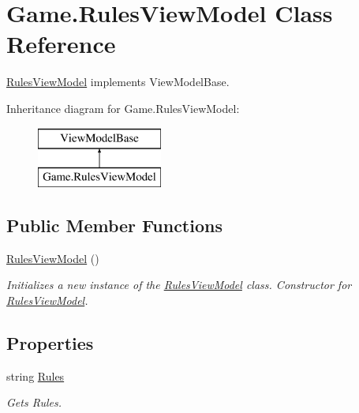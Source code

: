 \hypertarget{class_game_1_1_rules_view_model}{}\section{Game.\+Rules\+View\+Model Class Reference}
\label{class_game_1_1_rules_view_model}


\mbox{\hyperlink{class_game_1_1_rules_view_model}{Rules\+View\+Model}} implements View\+Model\+Base.  


Inheritance diagram for Game.\+Rules\+View\+Model\+:\begin{figure}[H]
\begin{center}
\leavevmode
\includegraphics[height=2.000000cm]{class_game_1_1_rules_view_model}
\end{center}
\end{figure}
\subsection*{Public Member Functions}
\begin{DoxyCompactItemize}
\item 
\mbox{\hyperlink{class_game_1_1_rules_view_model_a726e7b2414836d379f9bd87a7a7eb458}{Rules\+View\+Model}} ()
\begin{DoxyCompactList}\small\item\em Initializes a new instance of the \mbox{\hyperlink{class_game_1_1_rules_view_model}{Rules\+View\+Model}} class. Constructor for \mbox{\hyperlink{class_game_1_1_rules_view_model}{Rules\+View\+Model}}. \end{DoxyCompactList}\end{DoxyCompactItemize}
\subsection*{Properties}
\begin{DoxyCompactItemize}
\item 
string \mbox{\hyperlink{class_game_1_1_rules_view_model_a4557184da16245afd7e40c24901a8f89}{Rules}}
\begin{DoxyCompactList}\small\item\em Gets Rules. \end{DoxyCompactList}\end{DoxyCompactItemize}


